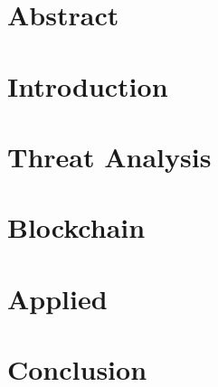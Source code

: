 \documentclass[11pt]{article}
\begin{document}

\clearpage


\tableofcontents
\clearpage

\section{Abstract}

\clearpage

\section{Introduction}
\label{sec:intro}

\clearpage

\section{Threat Analysis}
\label{sec:threat}

\clearpage

\section{Blockchain}
\label{sec:block}

\clearpage

\section{Applied}
\label{sec:applied}

\clearpage

\section{Conclusion}
\label{sec:conc}

\clearpage

{}

\end{document}
